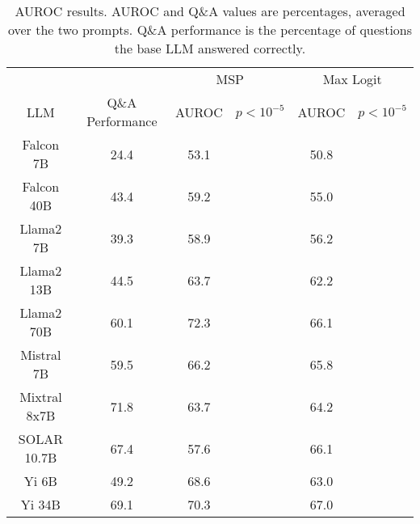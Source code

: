 \begin{table*}
\centering
\begin{tabular}{c|c|c|c|c|c}
& & \multicolumn{2}{c|}{MSP} & \multicolumn{2}{c}{Max Logit} \\ 
LLM & Q\&A Performance & AUROC & $p < 10^{-5}$ & AUROC & $p < 10^{-5}$\\ \hline
Falcon 7B & 24.4 & 53.1 &  & 50.8 & \\
Falcon 40B & 43.4 & 59.2 &  & 55.0 & \\
Llama2 7B & 39.3 & 58.9 &  & 56.2 & \\
Llama2 13B & 44.5 & 63.7 &  & 62.2 & \\
Llama2 70B & 60.1 & 72.3 &  & 66.1 & \\
Mistral 7B & 59.5 & 66.2 &  & 65.8 & \\
Mixtral 8x7B & 71.8 & 63.7 &  & 64.2 & \\
SOLAR 10.7B & 67.4 & 57.6 &  & 66.1 & \\
Yi 6B & 49.2 & 68.6 &  & 63.0 & \\
Yi 34B & 69.1 & 70.3 &  & 67.0 & \\
\hline
\end{tabular}
\caption{AUROC results. AUROC and Q\&A values are percentages, averaged over the two prompts. Q\&A performance is the percentage of questions the base LLM answered correctly.}
\label{tab:auroc}
\end{table*}
